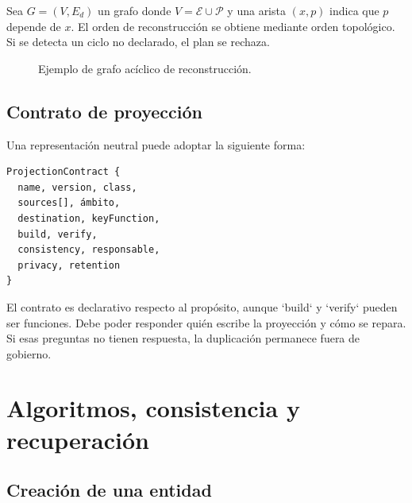 Sea $G=(V,E_d)$ un grafo donde $V=\mathcal{E}\cup\mathcal{P}$ y una arista $(x,p)$
indica que $p$ depende de $x$. El orden de reconstrucción se obtiene mediante orden
topológico. Si se detecta un ciclo no declarado, el plan se rechaza.

\begin{figure}[H]
\centering
{}
\caption{Ejemplo de grafo acíclico de reconstrucción.}
\label{fig:grafo-proyecciones}
\end{figure}

\section{Contrato de proyección}

Una representación neutral puede adoptar la siguiente forma:

\begin{verbatim}
ProjectionContract {
  name, version, class,
  sources[], ámbito,
  destination, keyFunction,
  build, verify,
  consistency, responsable,
  privacy, retention
}
\end{verbatim}

El contrato es declarativo respecto al propósito, aunque `build` y `verify` pueden ser
funciones. Debe poder responder quién escribe la proyección y cómo se repara. Si esas
preguntas no tienen respuesta, la duplicación permanece fuera de gobierno.

\chapter{Algoritmos, consistencia y recuperación}
\label{ch:algoritmos-consistencia}

\section{Creación de una entidad}

